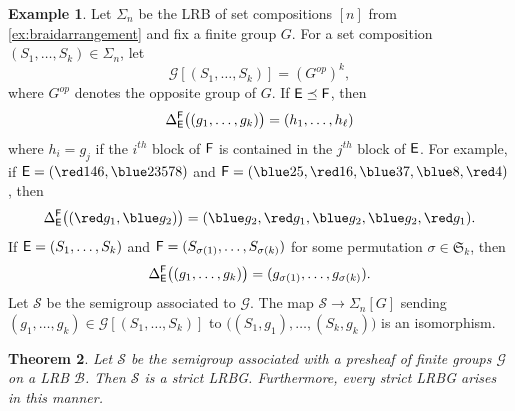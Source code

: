 \documentclass[11pt, oneside, reqno]{amsart}
\newtheorem{theorem}{Theorem}[section]
\theoremstyle{definition}
\newtheorem{example}[theorem]{Example}
\numberwithin{equation}{section}
\def \BB{{\mathcal{B}}}
\def \GG{{\mathcal{G}}}
\def \SS{{\mathcal{S}}}
\def \gsetcomposition{{\Sigma_n[G]}}
\def \hsiao {{\gsetcomposition}}
\begin{document}
\begin{example}\label{ex:presheaf-hsiao}
    Let $\Sigma_n$ be the LRB of set compositions $[n]$ from \cref{ex:braidarrangement}
    and fix a finite group $G$.
    For a set composition $(S_1, \ldots, S_k) \in \Sigma_n$, let
    \[
        \GG[ (S_1,\dots,S_k) ] = (G^{op})^k,
    \]
    where $G^{op}$ denotes the opposite group of $G$.
    If ${\sf E} \preceq {\sf F}$, then
    \[
        \Delta_{\sf E}^{\sf F} \big( (g_1,\dots,g_k) \big) = (h_1,\dots,h_\ell)
    \]
    where $h_i = g_j$ if the $i^{th}$ block of ${\sf F}$ is contained in the $j^{th}$ block of ${\sf E}$.
    For example, if ${\sf E} = ( {\red 146},{\blue 23578} )$ and ${\sf F} = ({\blue 25},{\red 16},{\blue 37},{\blue 8},{\red4})$, then
    \[
        \Delta_{\sf E}^{\sf F} \big( ({\red g_1},{\blue g_2}) \big) = ({\blue g_2},{\red g_1},{\blue g_2},{\blue g_2}, {\red g_1}).
    \]
    If ${\sf E} = (S_1,\dots,S_k)$ and ${\sf F} = (S_{\sigma(1)},\dots,S_{\sigma(k)})$ for some permutation $\sigma \in \mathfrak{S}_k$, then
    \[
        \Delta_{\sf E}^{\sf F} \big( (g_1,\dots,g_k) \big) = (g_{\sigma(1)},\dots,g_{\sigma(k)}).
    \]
    Let $\SS$ be the semigroup associated to $\GG$. The map $\SS \to \hsiao$ sending $(g_1 , \dots , g_k) \in \GG[(S_1 , \dots , S_k)]$ to $\big( (S_1,g_1) , \dots , (S_k,g_k) \big)$ is an isomorphism.

\end{example}

\begin{theorem}\label{thm:presheaf<->sLRBG}
    Let $\SS$ be the semigroup associated with a presheaf of finite groups
    $\GG$ on a LRB $\BB$. Then $\SS$ is a strict LRBG. Furthermore, every
    strict LRBG arises in this manner.
\end{theorem}
\end{document}
